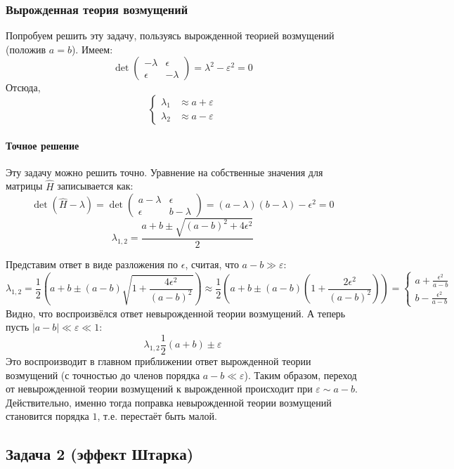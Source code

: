 \documentclass[a4paper,12pt]{article}
\begin{document}
\subsubsection*{Вырожденная теория возмущений}
Попробуем решить эту задачу, пользуясь вырожденной теорией возмущений (положив $a=b$). Имеем:
$$
\det\begin{pmatrix}-\lambda & \epsilon\\
\epsilon & -\lambda
\end{pmatrix}=\lambda^2-\varepsilon^2=0
$$
Отсюда,
\[
\begin{cases}
\lambda_{1} & \approx a+\varepsilon\\
\lambda_{2} & \approx a-\varepsilon
\end{cases}
\]
\paragraph{Точное решение}

Эту задачу можно решить точно. Уравнение на собственные значения для
матрицы $\hat{H}$ записывается как:
\[
\det\left(\hat{H}-\lambda\right)=\det\begin{pmatrix}a-\lambda & \epsilon\\
\epsilon & b-\lambda
\end{pmatrix}=(a-\lambda)(b-\lambda)-\epsilon^{2}=0
\]
\[
\lambda_{1,2}=\frac{a+b\pm\sqrt{(a-b)^{2}+4\epsilon^{2}}}{2}
\]


\noindent
Представим ответ в виде разложения по $\epsilon$, считая, что $a-b\gg\varepsilon$:
\[
\lambda_{1,2}=\frac{1}{2}\left(a+b\pm(a-b)\sqrt{1+\frac{4\epsilon^{2}}{(a-b)^{2}}}\right)
\approx\frac{1}{2}\left(a+b\pm(a-b)\left(1+\frac{2\epsilon^{2}}{\left(a-b\right)^{2}}\right)\right)=\begin{cases}
a+\frac{\epsilon^{2}}{a-b}\\
b-\frac{\epsilon^{2}}{a-b}
\end{cases}
\]
Видно, что воспроизвёлся ответ невырожденной теории возмущений.
\noindent
А теперь пусть $|a-b|\ll\varepsilon\ll1$:
\[
\lambda_{1,2}\frac{1}{2}(a+b)\pm\varepsilon
\]
Это воспроизводит в главном приближении ответ вырожденной теории возмущений (с точностью до членов порядка $a-b\ll\varepsilon$). Таким образом, переход от невырожденной теории возмущений к вырожденной происходит при $\varepsilon\sim a-b$. Действительно, именно тогда поправка невырожденной теории возмущений становится порядка $1$, т.е. перестаёт быть малой.


\subsection*{Задача 2 (эффект Штарка)}
\end{document}
